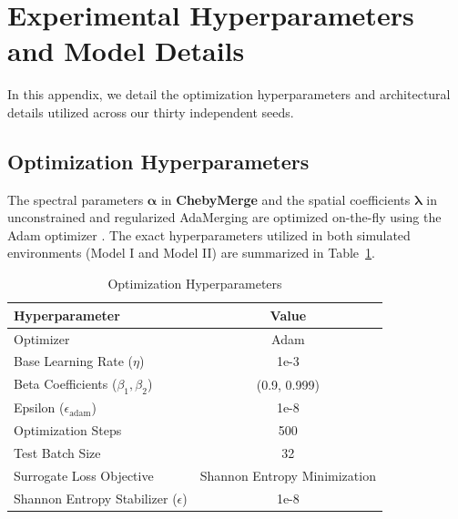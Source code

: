 \documentclass{article}
\theoremstyle{plain}
\theoremstyle{definition}
\theoremstyle{remark}
\begin{document}










\newpage
\appendix
\onecolumn
\section{Experimental Hyperparameters and Model Details}
\label{sec:appendix}

In this appendix, we detail the optimization hyperparameters and architectural details utilized across our thirty independent seeds.

\subsection{Optimization Hyperparameters}
The spectral parameters $\boldsymbol{\alpha}$ in \textbf{ChebyMerge} and the spatial coefficients $\boldsymbol{\lambda}$ in unconstrained and regularized AdaMerging are optimized on-the-fly using the Adam optimizer \cite{kingma2014adam}. The exact hyperparameters utilized in both simulated environments (Model I and Model II) are summarized in Table~\ref{tab:hyperparameters}.

\begin{table}[h]
\caption{Optimization Hyperparameters}
\label{tab:hyperparameters}
\vskip 0.15in
\begin{center}
\begin{small}
\begin{tabular}{lc}
\toprule
Hyperparameter & Value \\
\midrule
Optimizer & Adam \\
Base Learning Rate ($\eta$) & 1e-3 \\
Beta Coefficients ($\beta_1, \beta_2$) & (0.9, 0.999) \\
Epsilon ($\epsilon_{\text{adam}}$) & 1e-8 \\
Optimization Steps & 500 \\
Test Batch Size & 32 \\
Surrogate Loss Objective & Shannon Entropy Minimization \\
Shannon Entropy Stabilizer ($\epsilon$) & 1e-8 \\
\bottomrule
\end{tabular}
\end{small}
\end{center}
\vskip -0.1in
\end{table}
\end{document}
